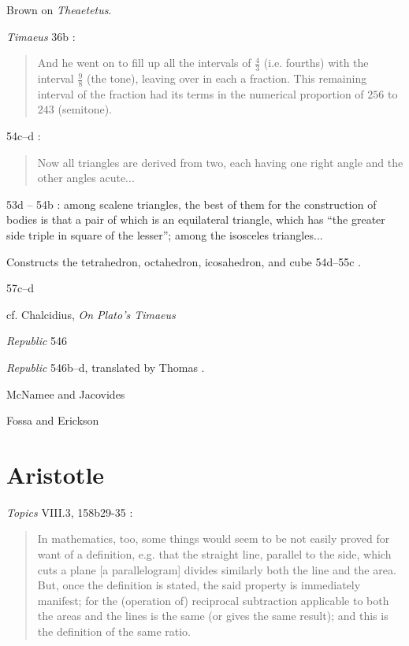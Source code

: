 \documentclass{article}
\theoremstyle{definition}
\begin{document}
Brown \cite{brown} on {\em Theaetetus}.


{\em Timaeus} 36b \cite[pp.~71--72]{timaeus}:

\begin{quote}
And he went on to fill up all the intervals of $\frac{4}{3}$ (i.e. fourths) with the interval $\frac{9}{8}$ (the tone), leaving over in each a fraction.
This remaining interval of the fraction had its terms in the numerical proportion of $256$ to $243$ (semitone).
\end{quote}

54c--d \cite[p.~212]{timaeus}: 

\begin{quote}
Now all triangles are derived from two, each having one right angle and the other angles acute...
\end{quote}

53d -- 54b \cite[pp.~213--214]{timaeus}: among scalene triangles, the best of them for the construction of bodies is that a pair of which is an equilateral triangle, which has ``the greater
side triple in square of the lesser''; among the isosceles triangles...

Constructs the tetrahedron, octahedron, icosahedron, and cube 54d--55c \cite[pp.~216--218]{timaeus}. 

57c--d \cite[p.~235]{timaeus}

cf. Chalcidius, {\em On Plato's Timaeus}

{\em Republic} 546

{\em Republic} 546b--d, translated by Thomas \cite[pp.~398--401]{thomasI}.

McNamee and Jacovides \cite{papyrus}

Fossa and Erickson \cite{births}






\section{Aristotle}
{\em Topics} VIII.3, 158b29-35 \cite[p.~80]{aristotle}:

\begin{quote}
In mathematics, too, some things would seem to be not easily
proved for want of a definition, e.g. that the straight line, parallel
to the side, which cuts a plane [a parallelogram] divides similarly
both the line and the area. But, once the definition is stated, the
said property is immediately manifest; for the (operation of)
reciprocal subtraction applicable to both the areas and the lines is
the same (or gives the same result); and this is the definition of the
same ratio.
\end{quote}
\end{document}
